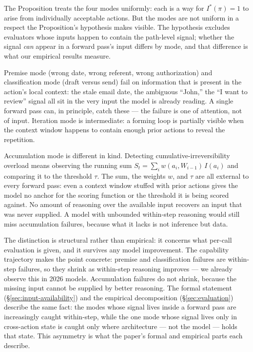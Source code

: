 \documentclass[11pt]{article}
\begin{document}
The Proposition treats the four modes uniformly: each is a way for $I^*(\pi) = 1$ to arise from individually acceptable actions. But the modes are not uniform in a respect the Proposition's hypothesis makes visible. The hypothesis excludes evaluators whose inputs happen to contain the path-level signal; whether the signal \emph{can} appear in a forward pass's input differs by mode, and that difference is what our empirical results measure.

Premise mode (wrong date, wrong referent, wrong authorization) and classification mode (draft versus send) fail on information that is present in the action's local context: the stale email date, the ambiguous ``John,'' the ``I want to review'' signal all sit in the very input the model is already reading. A single forward pass can, in principle, catch these --- the failure is one of attention, not of input. Iteration mode is intermediate: a forming loop is partially visible when the context window happens to contain enough prior actions to reveal the repetition.

Accumulation mode is different in kind. Detecting cumulative-irreversibility overload means observing the running sum $S_t = \sum_i w(a_i, W_{i-1})\, I(a_i)$ and comparing it to the threshold $\tau$. The sum, the weights $w$, and $\tau$ are all external to every forward pass: even a context window stuffed with prior actions gives the model no anchor for the scoring function or the threshold it is being scored against. No amount of reasoning over the available input recovers an input that was never supplied. A model with unbounded within-step reasoning would still miss accumulation failures, because what it lacks is not inference but data.

The distinction is structural rather than empirical: it concerns what per-call evaluation is given, and it survives any model improvement. The capability trajectory makes the point concrete: premise and classification failures are within-step failures, so they shrink as within-step reasoning improves --- we already observe this in 2026 models. Accumulation failures do not shrink, because the missing input cannot be supplied by better reasoning. The formal statement (\S\ref{sec:input-availability}) and the empirical decomposition (\S\ref{sec:evaluation}) describe the same fact: the modes whose signal lives inside a forward pass are increasingly caught within-step, while the one mode whose signal lives only in cross-action state is caught only where architecture --- not the model --- holds that state. This asymmetry is what the paper's formal and empirical parts each describe.
\end{document}

